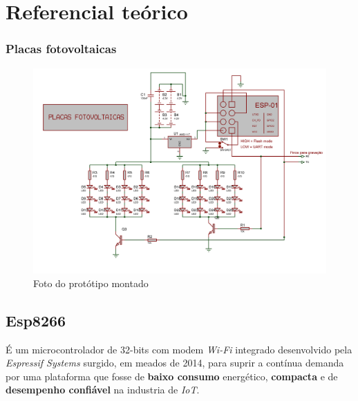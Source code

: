 \documentclass[
12pt,				%
openany,			%
twoside,			%
a4paper,			%
english,			%
french,				%
spanish,			%
brazil,				%
]{abntex2}
\begin{document}
\part{Referencial teórico}


%

\section{Placas fotovoltaicas}

\begin{figure}[ht!]
    \includegraphics[width=450pt]{images/circuit.png}
    \caption{Foto do protótipo montado}
\end{figure}

\chapter{Esp8266}
É um microcontrolador de 32-bits com modem \textit{Wi-Fi} integrado desenvolvido pela \textit{Espressif Systems}
surgido, em meados de 2014, para suprir a contínua demanda por uma plataforma que fosse de \textsf{\textbf{baixo consumo}} 
energético, \textsf{\textbf{compacta}} e de \textsf{\textbf{desempenho confiável}} na industria de \textit{IoT}.
\end{document}
